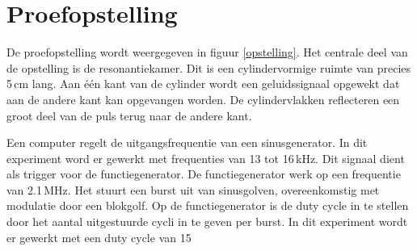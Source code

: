 \section{Proefopstelling}


De proefopstelling wordt weergegeven in figuur \ref{opstelling}. Het centrale 
deel van de opstelling is de resonantiekamer. Dit is een cylindervormige ruimte 
van precies 5\,cm lang. Aan \'e\'en kant van de cylinder wordt een 
geluidssignaal opgewekt dat aan de andere kant kan opgevangen worden. De 
cylindervlakken reflecteren een groot deel van de puls terug naar de andere 
kant. 

Een computer regelt de uitgangsfrequentie van een sinusgenerator. In dit 
experiment word er gewerkt met frequenties van 13 tot 16\,kHz. Dit signaal 
dient als trigger voor de functiegenerator. De functiegenerator werk op een 
frequentie van 2.1\,MHz. Het stuurt een burst uit van sinusgolven, 
overeenkomstig met modulatie door een blokgolf. Op de functiegenerator is de 
duty cycle in te stellen door het aantal uitgestuurde cycli in te geven per 
burst. In dit experiment wordt er gewerkt met een duty cycle van 15\,%
